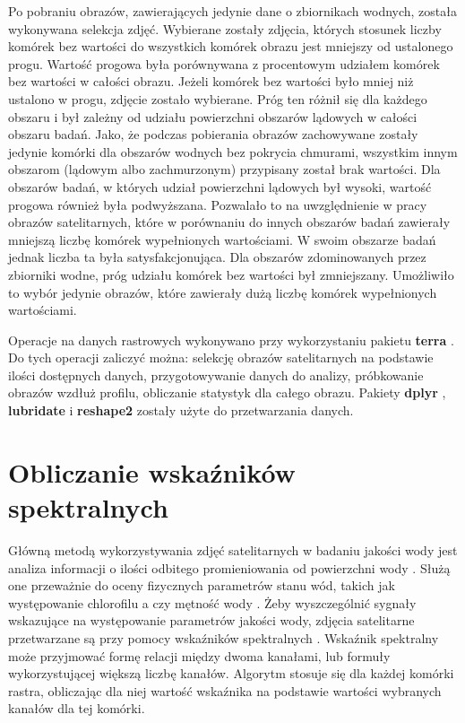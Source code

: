 \documentclass{amuthesis}
\begin{document}
Po pobraniu obrazów, zawierających jedynie dane o zbiornikach wodnych,
została wykonywana selekcja zdjęć. Wybierane zostały zdjęcia, których
stosunek liczby komórek bez wartości do wszystkich komórek obrazu jest
mniejszy od ustalonego progu. Wartość progowa była porównywana z
procentowym udziałem komórek bez wartości w całości obrazu. Jeżeli
komórek bez wartości było mniej niż ustalono w progu, zdjęcie zostało
wybierane. Próg ten różnił się dla każdego obszaru i był zależny od
udziału powierzchni obszarów lądowych w całości obszaru badań. Jako, że
podczas pobierania obrazów zachowywane zostały jedynie komórki dla
obszarów wodnych bez pokrycia chmurami, wszystkim innym obszarom
(lądowym albo zachmurzonym) przypisany został brak wartości. Dla
obszarów badań, w których udział powierzchni lądowych był wysoki,
wartość progowa również była podwyższana. Pozwalało to na uwzględnienie
w pracy obrazów satelitarnych, które w porównaniu do innych obszarów
badań zawierały mniejszą liczbę komórek wypełnionych wartościami. W
swoim obszarze badań jednak liczba ta była satysfakcjonująca. Dla
obszarów zdominowanych przez zbiorniki wodne, próg udziału komórek bez
wartości był zmniejszany. Umożliwiło to wybór jedynie obrazów, które
zawierały dużą liczbę komórek wypełnionych wartościami.

Operacje na danych rastrowych wykonywano przy wykorzystaniu pakietu
\textbf{terra} \autocite{R-terra}. Do tych operacji zaliczyć można:
selekcję obrazów satelitarnych na podstawie ilości dostępnych danych,
przygotowywanie danych do analizy, próbkowanie obrazów wzdłuż profilu,
obliczanie statystyk dla całego obrazu. Pakiety \textbf{dplyr}
\autocite{R-dplyr}, \textbf{lubridate} \autocite{R-lubridate} i
\textbf{reshape2} \autocite{R-reshape2} zostały użyte do przetwarzania
danych.

\hypertarget{obliczanie-wskaux17anikuxf3w-spektralnych}{%
\section{Obliczanie wskaźników
spektralnych}\label{obliczanie-wskaux17anikuxf3w-spektralnych}}

Główną metodą wykorzystywania zdjęć satelitarnych w badaniu jakości wody
jest analiza informacji o ilości odbitego promieniowania od powierzchni
wody \autocite{gholizadeh2016comprehensive}. Służą one przeważnie do
oceny fizycznych parametrów stanu wód, takich jak występowanie
chlorofilu a czy mętność wody \autocite{gholizadeh2016comprehensive}.
Żeby wyszczególnić sygnały wskazujące na występowanie parametrów jakości
wody, zdjęcia satelitarne przetwarzane są przy pomocy wskaźników
spektralnych \autocite{bijeesh2019comparative}. Wskaźnik spektralny może
przyjmować formę relacji między dwoma kanałami, lub formuły
wykorzystującej większą liczbę kanałów. Algorytm stosuje się dla każdej
komórki rastra, obliczając dla niej wartość wskaźnika na podstawie
wartości wybranych kanałów dla tej komórki.
\end{document}
